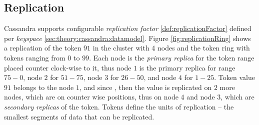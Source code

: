 \subsection{Replication}
Cassandra supports configurable \emph{replication factor} \ref{def:replicationFactor} defined per \emph{keyspace} \ref{sec:theory:cassandra:datamodel}. Figure \ref{fig:replicationRing} shows a replication of the token $91$ in the cluster with $4$ nodes and the token ring with tokens ranging from $0$ to $99$. 
Each node is the \emph{primary replica} for the token range placed counter clock-wise to it, thus node $1$ is the primary replica for range $75-0$, node $2$ for $51-75$, node $3$ for $26-50$, and node $4$ for $1-25$. 
Token value $91$ belongs to the node $1$, and since , then the value is replicated on $2$ more nodes, which are on counter wise positions, thus on node $4$ and node $3$, which are \emph{secondary replicas} of the token. Tokens define the units of replication -- the smallest segments of data that can be replicated. 




  


